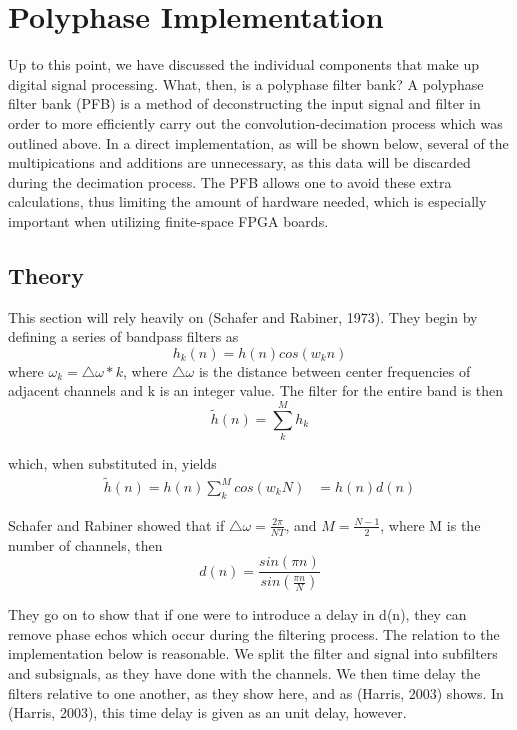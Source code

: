 \documentclass{report}
\begin{document}
\chapter{Polyphase Implementation}

Up to this point, we have discussed the individual components that make up digital signal processing.  What, then, is a polyphase filter bank?  A polyphase filter bank (PFB) is a method of deconstructing the input signal and filter in order to more efficiently carry out the convolution-decimation process which was outlined above.  In a direct implementation, as will be shown below, several of the multipications and additions are unnecessary, as this data will be discarded during the decimation process.  The PFB allows one to avoid these extra calculations, thus limiting the amount of hardware needed, which is especially important when utilizing finite-space FPGA boards.
\section{Theory}
This section will rely heavily on (Schafer and Rabiner, 1973).  They begin by defining a series of bandpass filters as 
\begin{equation}
h_k(n) = h(n)cos(w_kn)
\end{equation}
where $\omega_k=\triangle\omega * k$, where $\triangle\omega$ is the distance between center frequencies of adjacent channels and k is an integer value.  The filter for the entire band is then
\begin{equation}
\widetilde{h}(n) = \sum_k^M h_k
\end{equation}

which, when substituted in, yields
\begin{align}
\widetilde{h}(n) = h(n)\sum_k^M cos(w_kN)
& = h(n)d(n)
\end{align}

Schafer and Rabiner showed that if $\triangle \omega = \frac{2\pi}{NT}$, and $M = \frac{N-1}{2}$, where M is the number of channels, then 
\begin{equation}
d(n) = \frac{sin(\pi n)}{sin(\frac{\pi n}{N})}
\end{equation}

They go on to show that if one were to introduce a delay in d(n), they can remove phase echos which occur during the filtering process.  The relation to the implementation below is reasonable.  We split the filter and signal into subfilters and subsignals, as they have done with the channels.  We then time delay the filters relative to one another, as they show here, and as (Harris, 2003) shows.  In (Harris, 2003), this time delay is given as an unit delay, however.
\end{document}
